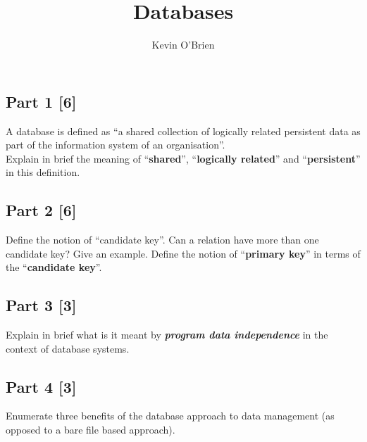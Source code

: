 \documentclass[12pts]{article}
\title{Databases}
\author{Kevin O'Brien}
\begin{document}
\maketitle
\subsection*{Part 1 [6]}
A database is defined as “a shared collection of logically related persistent data as part of the
information system of an organisation”.\\ Explain in brief the meaning of “\textbf{shared}”, “\textbf{logically
related}” and “\textbf{persistent}” in this definition.
\subsection*{Part 2 [6]}
Define the notion of “candidate key”. Can a relation have more than one candidate key? Give
an example. Define the notion of “\textbf{primary key}” in terms of the “\textbf{candidate key}”.
\subsection*{Part 3 [3]}
Explain in brief what is it meant by \textit{\textbf{program data independence}} in the context of database
systems.
\subsection*{Part 4 [3]}
Enumerate three benefits of the database approach to data management (as opposed to a
bare file based approach).
\end{document}
